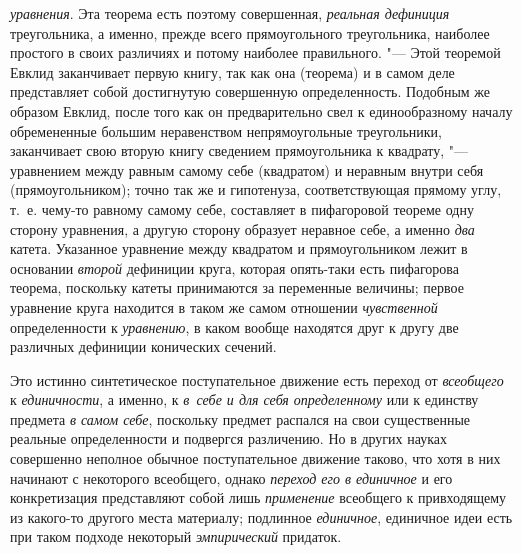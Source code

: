 {\em уравнения}. Эта
теорема есть поэтому совершенная,
{\em реальная дефиниция}
треугольника, а именно, прежде всего прямоугольного
треугольника, наиболее простого в своих различиях и потому наиболее
правильного. "--- Этой теоремой Евклид заканчивает первую
книгу, так как она (теорема) и в самом деле представляет собой достигнутую
совершенную определенность. Подобным же образом Евклид, после того как он
предварительно свел к единообразному
началу
обремененные большим неравенством непрямоугольные
треугольники, заканчивает свою вторую книгу сведением прямоугольника к
квадрату, "--- уравнением между равным самому себе (квадратом)
и
неравным внутри себя (прямоугольником); точно так же и
гипотенуза, соответствующая прямому углу, т.~е. чему-то равному самому
себе, составляет в пифагоровой теореме одну сторону уравнения, а другую
сторону образует неравное себе, а именно
{\em два} катета.
Указанное уравнение между квадратом и прямоугольником лежит в основании
{\em второй} дефиниции
круга, которая опять-таки есть пифагорова теорема, поскольку катеты
принимаются за переменные величины; первое уравнение круга находится в
таком же самом отношении
{\em чувственной}
определенности к
{\em уравнению}, в каком
вообще находятся друг к другу две различных дефиниции конических сечений.

Это истинно синтетическое поступательное движение есть переход
от {\em всеобщего} к
{\em единичности}, а
именно, к {\em в~себе и для себя
определенному} или к единству предмета
{\em в самом себе},
поскольку предмет распался на свои существенные реальные
определенности и подвергся различению. Но в других науках совершенно
неполное обычное поступательное движение таково, что хотя в них начинают с
некоторого всеобщего, однако
{\em переход его в единичное}
и его конкретизация представляют собой лишь
{\em применение}
всеобщего к привходящему из какого-то другого места
материалу; подлинное {\em единичное},
единичное идеи есть при таком подходе некоторый
{\em эмпирический} придаток.

